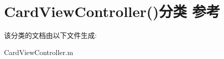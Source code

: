 \hypertarget{category_card_view_controller_07_08}{\section{Card\-View\-Controller()分类 参考}
\label{category_card_view_controller_07_08}
}


该分类的文档由以下文件生成\-:\begin{DoxyCompactItemize}
\item 
Card\-View\-Controller.\-m\end{DoxyCompactItemize}
